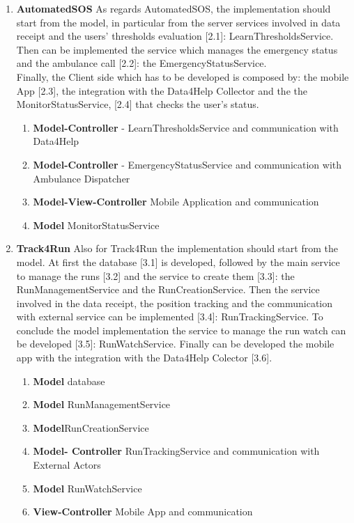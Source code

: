 \documentclass[a4paper]{article}
\begin{document}
\begin{enumerate}[label*=\bf{\arabic*.}]
\item \textbf{AutomatedSOS}
As regards AutomatedSOS, the implementation should start from the model, in particular from the server services involved in data receipt and the users' thresholds evaluation [2.1]: LearnThresholdsService.\\
Then  can be implemented the service which manages the emergency status and the ambulance call [2.2]: the EmergencyStatusService.\\
Finally, the Client side which has to be developed is composed by: the mobile App [2.3], the integration with the Data4Help Collector and the the MonitorStatusService, [2.4] that checks the user's status.

\begin{enumerate}[label*=\bf{.\arabic*}]
    \item \textbf{Model-Controller} - LearnThresholdsService and communication with Data4Help
    \item \textbf{Model-Controller} - EmergencyStatusService and communication with Ambulance Dispatcher
    \item \textbf{Model-View-Controller} Mobile Application and communication
    \item \textbf{Model} MonitorStatusService
\end{enumerate}

\item \textbf{Track4Run}
Also for Track4Run the implementation should start from the model. At first the database [3.1] is developed, followed by the main service to manage the runs [3.2] and the service to create them [3.3]: the RunManagementService and the RunCreationService. Then the service involved in the data receipt, the position tracking and the communication with external service can be implemented [3.4]: RunTrackingService. To conclude the model implementation the service to manage the run watch can be developed [3.5]: RunWatchService. 
Finally can be developed the mobile app with the integration with the Data4Help Colector [3.6].

\begin{enumerate}[label*=\bf{.\arabic*}]
    \item \textbf{Model} database
    \item \textbf{Model} RunManagementService
    \item \textbf{Model}RunCreationService
    \item \textbf{Model- Controller} RunTrackingService and communication with External Actors
    \item \textbf{Model} RunWatchService
    \item \textbf{View-Controller} Mobile App and communication
\end{enumerate}
\end{enumerate}
\end{document}
